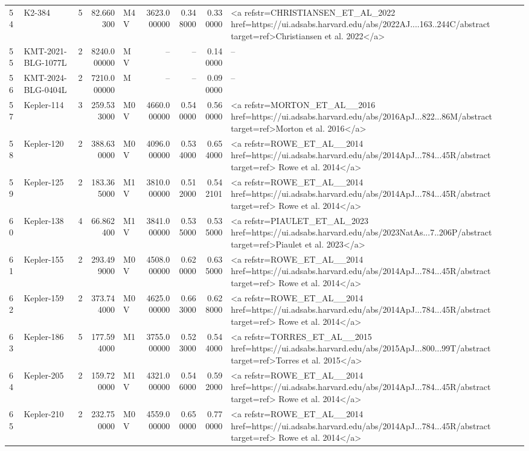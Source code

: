 \begin{tabular}{llrrlrrrl}
54 & K2-384 & 5 & 82.660300 & M4 V & 3623.000000 & 0.348000 & 0.330000 & <a refstr=CHRISTIANSEN_ET_AL_2022 href=https://ui.adsabs.harvard.edu/abs/2022AJ....163..244C/abstract target=ref>Christiansen et al. 2022</a> \\
55 & KMT-2021-BLG-1077L & 2 & 8240.000000 & M V & -- & -- & 0.140000 & -- \\
56 & KMT-2024-BLG-0404L & 2 & 7210.000000 & M & -- & -- & 0.090000 & -- \\
57 & Kepler-114 & 3 & 259.533000 & M0 V & 4660.000000 & 0.540000 & 0.560000 & <a refstr=MORTON_ET_AL__2016 href=https://ui.adsabs.harvard.edu/abs/2016ApJ...822...86M/abstract target=ref>Morton et al. 2016</a> \\
58 & Kepler-120 & 2 & 388.630000 & M0 V & 4096.000000 & 0.534000 & 0.654000 & <a refstr=ROWE_ET_AL__2014 href=https://ui.adsabs.harvard.edu/abs/2014ApJ...784...45R/abstract target=ref> Rowe et al. 2014</a> \\
59 & Kepler-125 & 2 & 183.365000 & M1 V & 3810.000000 & 0.512000 & 0.542101 & <a refstr=ROWE_ET_AL__2014 href=https://ui.adsabs.harvard.edu/abs/2014ApJ...784...45R/abstract target=ref> Rowe et al. 2014</a> \\
60 & Kepler-138 & 4 & 66.862400 & M1 V & 3841.000000 & 0.535000 & 0.535000 & <a refstr=PIAULET_ET_AL_2023 href=https://ui.adsabs.harvard.edu/abs/2023NatAs...7..206P/abstract target=ref>Piaulet et al. 2023</a> \\
61 & Kepler-155 & 2 & 293.499000 & M0 V & 4508.000000 & 0.620000 & 0.635000 & <a refstr=ROWE_ET_AL__2014 href=https://ui.adsabs.harvard.edu/abs/2014ApJ...784...45R/abstract target=ref> Rowe et al. 2014</a> \\
62 & Kepler-159 & 2 & 373.744000 & M0 V & 4625.000000 & 0.663000 & 0.628000 & <a refstr=ROWE_ET_AL__2014 href=https://ui.adsabs.harvard.edu/abs/2014ApJ...784...45R/abstract target=ref> Rowe et al. 2014</a> \\
63 & Kepler-186 & 5 & 177.594000 & M1 & 3755.000000 & 0.523000 & 0.544000 & <a refstr=TORRES_ET_AL__2015 href=https://ui.adsabs.harvard.edu/abs/2015ApJ...800...99T/abstract target=ref>Torres et al. 2015</a> \\
64 & Kepler-205 & 2 & 159.720000 & M1 V & 4321.000000 & 0.546000 & 0.592000 & <a refstr=ROWE_ET_AL__2014 href=https://ui.adsabs.harvard.edu/abs/2014ApJ...784...45R/abstract target=ref> Rowe et al. 2014</a> \\
65 & Kepler-210 & 2 & 232.750000 & M0 V & 4559.000000 & 0.650000 & 0.770000 & <a refstr=ROWE_ET_AL__2014 href=https://ui.adsabs.harvard.edu/abs/2014ApJ...784...45R/abstract target=ref> Rowe et al. 2014</a> \\

\end{tabular}
